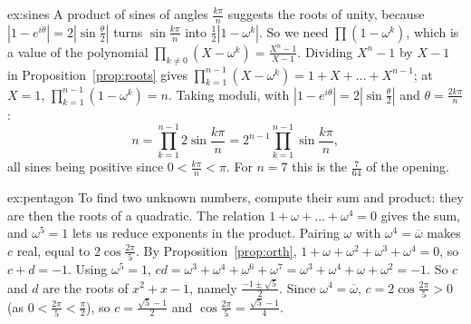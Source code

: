 \begin{solution}{ex:sines}
\idea A product of sines of angles $\frac{k\pi}n$ suggests the roots of unity, because $|1-e^{i\theta}|=2|\sin\frac\theta2|$ turns $\sin\frac{k\pi}n$ into $\frac12|1-\omega^k|$. So we need $\prod(1-\omega^k)$, which is a value of the polynomial $\prod_{k\ne0}(X-\omega^k)=\frac{X^n-1}{X-1}$.
\writeup Dividing $X^n-1$ by $X-1$ in Proposition~\ref{prop:roots} gives $\prod_{k=1}^{n-1}(X-\omega^k)=1+X+\dots+X^{n-1}$; at $X=1$, $\prod_{k=1}^{n-1}(1-\omega^k)=n$.
Taking moduli, with $|1-e^{i\theta}|=2|\sin\frac\theta2|$ and $\theta=\frac{2k\pi}n$:
\[
n=\prod_{k=1}^{n-1}2\sin\frac{k\pi}n=2^{n-1}\prod_{k=1}^{n-1}\sin\frac{k\pi}n,
\]
all sines being positive since $0<\frac{k\pi}n<\pi$. For $n=7$ this is the $\frac7{64}$ of the opening.
\end{solution}

\begin{solution}{ex:pentagon}
\idea To find two unknown numbers, compute their sum and product: they are then the roots of a quadratic. The relation $1+\omega+\dots+\omega^4=0$ gives the sum, and $\omega^5=1$ lets us reduce exponents in the product. Pairing $\omega$ with $\omega^4=\overline\omega$ makes $c$ real, equal to $2\cos\frac{2\pi}5$.
\writeup By Proposition~\ref{prop:orth}, $1+\omega+\omega^2+\omega^3+\omega^4=0$, so $c+d=-1$. Using $\omega^5=1$,
$cd=\omega^3+\omega^4+\omega^6+\omega^7=\omega^3+\omega^4+\omega+\omega^2=-1$. So $c$ and $d$ are the roots of
$x^2+x-1$, namely $\frac{-1\pm\sqrt5}2$. Since $\omega^4=\overline\omega$, $c=2\cos\frac{2\pi}5>0$ (as $0<\frac{2\pi}5<\frac\pi2$), so
$c=\frac{\sqrt5-1}2$ and $\cos\frac{2\pi}5=\frac{\sqrt5-1}4$.
\end{solution}

